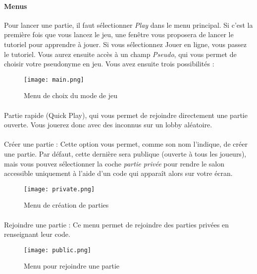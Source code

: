 \paragraph{Menus}

    Pour lancer une partie, il faut sélectionner \textit{Play} dans le menu principal. Si c'est la première fois que vous lancez le jeu, 
    une fenêtre vous proposera de lancer le tutoriel pour apprendre à jouer. Si vous sélectionnez Jouer en ligne, vous passez le tutoriel. 
    Vous aurez ensuite accès à un champ \textit{Pseudo}, qui vous permet de choisir votre pseudonyme en jeu. Vous avez ensuite trois possibilités :

    \begin{figure}[hbt!]
        \centering
        \texttt{[image: main.png]}
        \caption{Menu de choix du mode de jeu}
    \end{figure}
    \FloatBarrier

    \paragraph{}
    Partie rapide (Quick Play), qui vous permet de rejoindre directement une partie ouverte. Vous jouerez donc avec des 
    inconnus sur un lobby aléatoire.

    \paragraph{}
    Créer une partie : Cette option vous permet, comme son nom l'indique, de créer une partie. Par défaut, cette dernière 
    sera publique (ouverte à tous les joueurs), mais vous pouvez sélectionner la coche \textit{partie privée} pour rendre 
    le salon accessible uniquement à l'aide d'un code qui apparaît alors sur votre écran.

    \begin{figure}[hbt!]
        \centering
        \texttt{[image: private.png]}
        \caption{Menu de création de parties}
    \end{figure}
    \FloatBarrier

    \paragraph{}
    Rejoindre une partie : Ce menu permet de rejoindre des parties privées en renseignant leur code.

    \begin{figure}[hbt!]
        \centering
        \texttt{[image: public.png]}
        \caption{Menu pour rejoindre une partie}
    \end{figure}
    \FloatBarrier


